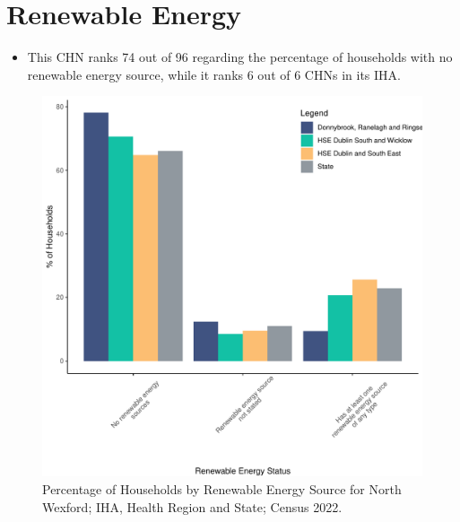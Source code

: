 \documentclass{article}
\begin{document}
\section{Renewable Energy}\label{sect:RE}
\begin{itemize}
\item This CHN ranks  74 out of 96 regarding the percentage of households with no renewable energy source, while it ranks   6 out of 6 CHNs in its IHA.
\end{itemize}
\begin{figure}[H]
	\centering
	\includegraphics[width = 140mm]{../figures/RenewableEnergyED.pdf}
	\caption{Percentage of Households by Renewable Energy Source for North Wexford; IHA, Health Region and State; Census 2022.}
	\label{fig:vbnv}
	\end{figure}
\end{document}
